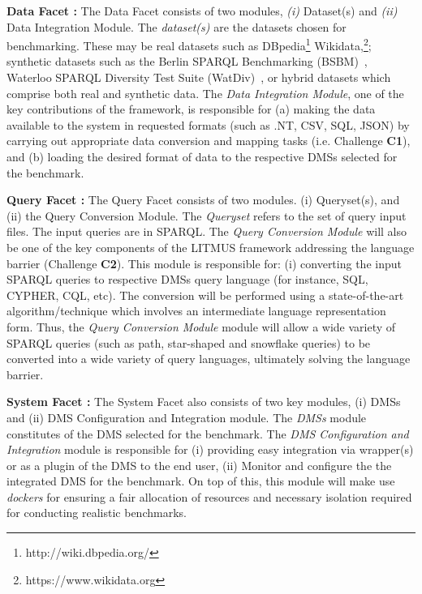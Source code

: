 \documentclass{llncs}
\begin{document}
\begin{itemize}[nosep]
        \textbf{Data Facet :} The Data Facet consists of two modules, \textit{(i)} Dataset(s) and \textit{(ii)} Data Integration Module. The \textit{dataset(s)} are the datasets chosen for benchmarking. These may be real datasets such as DBpedia\footnote{http://wiki.dbpedia.org/} Wikidata,\footnote{https://www.wikidata.org}; synthetic datasets such as the Berlin SPARQL Benchmarking (BSBM)~\cite{bizer2008benchmarking,Bizer2009TheBS}, Waterloo SPARQL Diversity Test Suite (WatDiv)~\cite{alucc2014diversified}, or hybrid datasets which comprise both real and synthetic data. 
        The \textit{Data Integration Module}, one of the key contributions of the framework, is responsible for (a) making the data available to the system in requested formats (such as .NT, CSV, SQL, JSON) by carrying out appropriate data conversion and mapping tasks (i.e. Challenge \textbf{C1}), and (b) loading the desired format of data to the respective DMSs selected for the benchmark. 
        
        \textbf{Query Facet :} The Query Facet consists of two modules. (i) Queryset(s), and (ii) the Query Conversion Module. The \textit{Queryset} refers to the set of query input files. The input queries are in SPARQL. The \textit{Query Conversion Module} will also be one of the key components of the LITMUS framework addressing the language barrier (Challenge \textbf{C2}). This module is responsible for: (i) converting the input SPARQL queries to respective DMSs query language (for instance, SQL, CYPHER, CQL, etc). The conversion will be performed using a state-of-the-art algorithm/technique which involves an intermediate language representation form. Thus, the \textit{Query Conversion Module} module will allow a wide variety of SPARQL queries (such as path, star-shaped and snowflake queries) to be converted into a wide variety of query languages, ultimately solving the language barrier.
        
        \textbf{System Facet :} The System Facet also consists of two key modules, (i) DMSs and (ii) DMS Configuration and Integration module. The \textit{DMSs} module  constitutes of the DMS selected for the benchmark. The \textit{DMS Configuration and Integration} module is responsible for (i) providing easy integration via wrapper(s) or as a plugin of the DMS to the end user, (ii) Monitor and configure the the integrated DMS for the benchmark. On top of this, this module will make use \textit{dockers} for ensuring a fair allocation of resources and necessary isolation required for conducting realistic benchmarks. 
        

\end{itemize}
\end{document}
